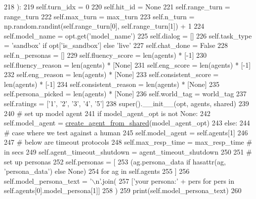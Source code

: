 \begin{DoxyCode}
218     ):
219         self.turn\_idx = 0
220         self.hit\_id = \textcolor{keywordtype}{None}
221         self.range\_turn = range\_turn
222         self.max\_turn = max\_turn
223         self.n\_turn = np.random.randint(self.range\_turn[0], self.range\_turn[1]) + 1
224         self.model\_name = opt.get(\textcolor{stringliteral}{'model\_name'})
225         self.dialog = []
226         self.task\_type = \textcolor{stringliteral}{'sandbox'} \textcolor{keywordflow}{if} opt[\textcolor{stringliteral}{'is\_sandbox'}] \textcolor{keywordflow}{else} \textcolor{stringliteral}{'live'}
227         self.chat\_done = \textcolor{keyword}{False}
228         self.n\_personas = []
229         self.fluency\_score = len(agents) * [-1]
230         self.fluency\_reason = len(agents) * [\textcolor{keywordtype}{None}]
231         self.eng\_score = len(agents) * [-1]
232         self.eng\_reason = len(agents) * [\textcolor{keywordtype}{None}]
233         self.consistent\_score = len(agents) * [-1]
234         self.consistent\_reason = len(agents) * [\textcolor{keywordtype}{None}]
235         self.persona\_picked = len(agents) * [\textcolor{keywordtype}{None}]
236         self.world\_tag = world\_tag
237         self.ratings = [\textcolor{stringliteral}{'1'}, \textcolor{stringliteral}{'2'}, \textcolor{stringliteral}{'3'}, \textcolor{stringliteral}{'4'}, \textcolor{stringliteral}{'5'}]
238         super().\_\_init\_\_(opt, agents, shared)
239 
240         \textcolor{comment}{# set up model agent}
241         \textcolor{keywordflow}{if} model\_agent\_opt \textcolor{keywordflow}{is} \textcolor{keywordflow}{not} \textcolor{keywordtype}{None}:
242             self.model\_agent = \hyperlink{namespaceparlai_1_1core_1_1agents_aa5af5dd1d2f9da491b60348d479b849f}{create\_agent\_from\_shared}(model\_agent\_opt)
243         \textcolor{keywordflow}{else}:
244             \textcolor{comment}{# case where we test against a human}
245             self.model\_agent = self.agents[1]
246 
247         \textcolor{comment}{# below are timeout protocols}
248         self.max\_resp\_time = max\_resp\_time  \textcolor{comment}{# in secs}
249         self.agent\_timeout\_shutdown = agent\_timeout\_shutdown
250 
251         \textcolor{comment}{# set up personas}
252         self.personas = [
253             (ag.persona\_data \textcolor{keywordflow}{if} hasattr(ag, \textcolor{stringliteral}{'persona\_data'}) \textcolor{keywordflow}{else} \textcolor{keywordtype}{None})
254             \textcolor{keywordflow}{for} ag \textcolor{keywordflow}{in} self.agents
255         ]
256         self.model\_persona\_text = \textcolor{stringliteral}{'\(\backslash\)n'}.join(
257             [\textcolor{stringliteral}{'your persona:'} + pers \textcolor{keywordflow}{for} pers \textcolor{keywordflow}{in} self.agents[0].model\_persona[1]]
258         )
259         print(self.model\_persona\_text)
260 
\end{DoxyCode}


